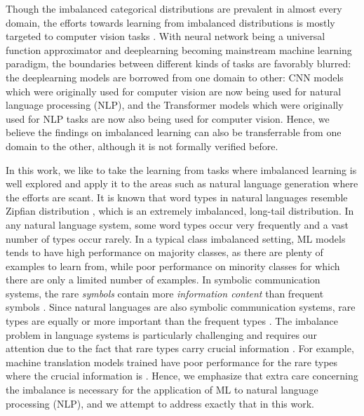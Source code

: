 Though the imbalanced categorical distributions are prevalent in almost every domain, the efforts towards learning from imbalanced distributions is mostly targeted to computer vision tasks \cite{Johnson2019SurveyImbalance}.
With neural network being a universal function approximator and deeplearning becoming mainstream machine learning paradigm, the boundaries between different kinds of tasks are favorably blurred: the deeplearning models are borrowed from one domain to other: CNN models which were originally used for computer vision are now being used for natural language processing (NLP), and the Transformer models which were originally used for NLP tasks are now also being used for computer vision.
Hence, we believe the findings on imbalanced learning can also be transferrable from one domain to the other, although it is not formally verified before.

In this work, we like to take the learning from tasks where imbalanced learning is well explored and apply it to the areas such as natural language generation where the efforts are scant.
It is known that word types in natural languages resemble Zipfian distribution \cite{zipf1949human,powers-1998-zipf-apps}, which is an extremely imbalanced, long-tail distribution. 
In any natural language system, some word types occur very frequently and a vast number of types occur rarely. 
In a typical class imbalanced setting, ML models tends to have high performance on majority classes, as there are plenty of examples to learn from, while poor performance on minority classes for which there are only a limited number of examples.
In symbolic communication systems, the rare \textit{symbols} contain more \textit{information content} than frequent symbols \cite{shannon1948mathematical}.
Since natural languages are also symbolic communication systems, rare types are equally or more important than the frequent types \cite{gowda2021macroaverage}. 
The imbalance problem in language systems is particularly challenging and requires our attention due to the fact that rare types carry crucial information \cite{steedman-2008-last}.
For example, machine translation models trained have poor performance for the rare types where the crucial information is \cite{gowda-may-2020-finding,gowda2021-many-eng}.
Hence, we emphasize that extra care concerning the imbalance is necessary for the application of ML to natural language processing (NLP), and we attempt to address exactly that in this work.

